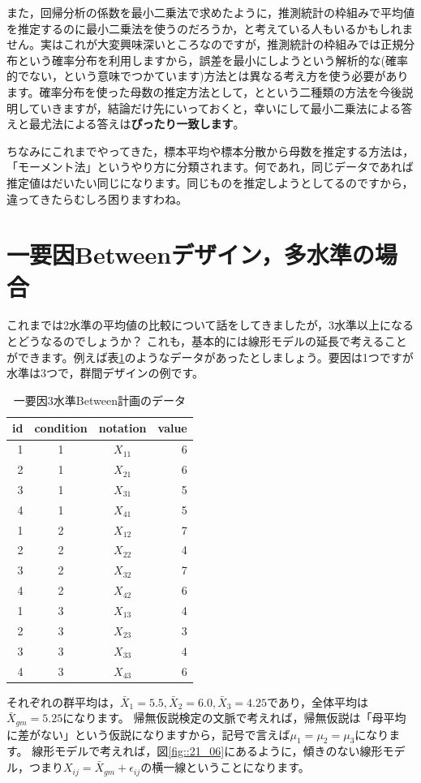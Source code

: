\documentclass{ltjsarticle}
\begin{document}
また，回帰分析の係数を最小二乗法で求めたように，推測統計の枠組みで平均値を推定するのに最小二乗法を使うのだろうか，と考えている人もいるかもしれません。実はこれが大変興味深いところなのですが，推測統計の枠組みでは正規分布という確率分布を利用しますから，誤差を最小にしようという解析的な(確率的でない，という意味でつかています)方法とは異なる考え方を使う必要があります。確率分布を使った母数の推定方法として，とという二種類の方法を今後説明していきますが，結論だけ先にいっておくと，幸いにして最小二乗法による答えと最尤法による答えは\textbf{ぴったり一致します}。

ちなみにこれまでやってきた，標本平均や標本分散から母数を推定する方法は，「モーメント法」というやり方に分類されます。何であれ，同じデータであれば推定値はだいたい同じになります。同じものを推定しようとしてるのですから，違ってきたらむしろ困りますわね。

\section{一要因Betweenデザイン，多水準の場合}
これまでは2水準の平均値の比較について話をしてきましたが，3水準以上になるとどうなるのでしょうか？ 
これも，基本的には線形モデルの延長で考えることができます。例えば表\ref{table::21_02}のようなデータがあったとしましょう。要因は1つですが水準は3つで，群間デザインの例です。
\begin{table}[ht]
    \centering
    \caption{一要因3水準Between計画のデータ}
    \begin{tabular}{rccr}
      \hline
    id & condition & notation & value \\ 
      \hline
      1 & 1 & $X_{11}$ & 6 \\ 
      2 & 1 & $X_{21}$ & 6 \\ 
      3 & 1 & $X_{31}$ & 5 \\ 
      4 & 1 & $X_{41}$ & 5 \\ 
      1 & 2 & $X_{12}$ & 7 \\ 
      2 & 2 & $X_{22}$ & 4 \\ 
      3 & 2 & $X_{32}$ & 7 \\ 
      4 & 2 & $X_{42}$ & 6 \\ 
      1 & 3 & $X_{13}$ & 4 \\ 
      2 & 3 & $X_{23}$ & 3 \\ 
      3 & 3 & $X_{33}$ & 4 \\ 
      4 & 3 & $X_{43}$ & 6 \\ 
       \hline
    \end{tabular}
    \label{table::21_02}
    \end{table}
それぞれの群平均は，$\bar{X}_1 = 5.5,\bar{X}_2 = 6.0,\bar{X}_3 = 4.25$であり，全体平均は$\bar{X}_{gm}= 5.25$になります。
帰無仮説検定の文脈で考えれば，帰無仮説は「母平均に差がない」という仮説になりますから，記号で言えば$\mu_1 = \mu_2 = \mu_3$になります。
線形モデルで考えれば，図\ref{fig::21_06}にあるように，傾きのない線形モデル，つまり$X_{ij} = \bar{X}_{gm} + \epsilon_{ij}$の横一線ということになります。
\end{document}
